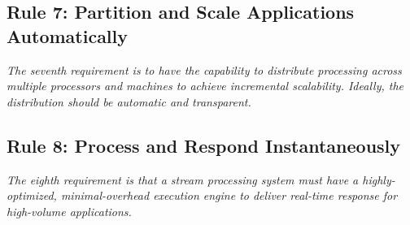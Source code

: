 \subsection{Rule 7: Partition and Scale Applications Automatically}
\textit{The seventh requirement is to have the capability to
        distribute processing across multiple processors and
        machines to achieve incremental scalability. Ideally, the
        distribution should be automatic and transparent.}

\subsection{Rule 8: Process and Respond Instantaneously}
\textit{The eighth requirement is that a stream processing system
must have a highly-optimized, minimal-overhead execution
engine to deliver real-time response for high-volume
applications.}





























